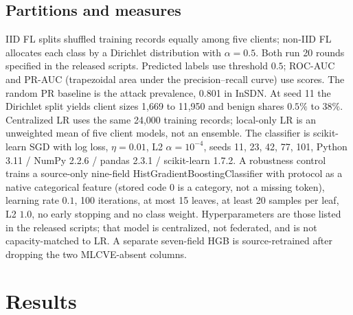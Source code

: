 \documentclass[conference,a4paper]{IEEEtran}
\begin{document}
\subsection{Partitions and measures}
IID FL splits shuffled training records equally among five clients; non-IID FL allocates each class by a Dirichlet distribution with $\alpha=0.5$. Both run 20 rounds specified in the released scripts. Predicted labels use threshold $0.5$; ROC-AUC and PR-AUC (trapezoidal area under the precision--recall curve) use scores. The random PR baseline is the attack prevalence, 0.801 in InSDN. At seed 11 the Dirichlet split yields client sizes 1,669 to 11,950 and benign shares $0.5\%$ to $38\%$. Centralized LR uses the same 24,000 training records; local-only LR is an unweighted mean of five client models, not an ensemble. The classifier is scikit-learn SGD with log loss, $\eta=0.01$, L2 $\alpha=10^{-4}$, seeds 11, 23, 42, 77, 101, Python 3.11 / NumPy 2.2.6 / pandas 2.3.1 / scikit-learn 1.7.2. A robustness control trains a source-only nine-field HistGradientBoostingClassifier with protocol as a native categorical feature (stored code 0 is a category, not a missing token), learning rate $0.1$, 100 iterations, at most 15 leaves, at least 20 samples per leaf, L2 $1.0$, no early stopping and no class weight. Hyperparameters are those listed in the released scripts; that model is centralized, not federated, and is not capacity-matched to LR. A separate seven-field HGB is source-retrained after dropping the two MLCVE-absent columns.

\section{Results}
\end{document}
